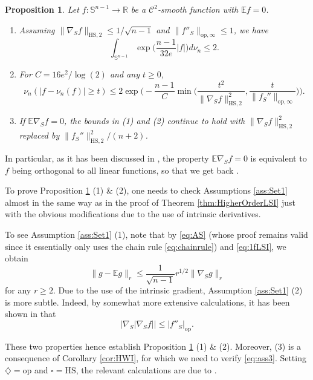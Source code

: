 \documentclass[a4paper,12pt]{amsart}
\numberwithin{equation}{section}
\newtheorem{proposition}[satz]{Proposition}
\theoremstyle{remark}
\def\E{{\mathbb E}}
\def\S{{\mathbb S}}
\begin{document}
\begin{proposition}\label{prop:HigherOrderSphereIntr}
	Let $f \colon \S^{n-1} \to \mathbb{R}$ be a $\mathcal{C}^2$-smooth function with $\E f =0$.
	\begin{enumerate}
		\item Assuming $\lVert \nabla_S f \rVert_{\mathrm{HS},2} \le 1/\sqrt{n-1}$ and $\lVert f''_S \rVert_{\mathrm{op},\infty} \le 1$, we have
		\[
		\int_{\S^{n-1}} \exp\Big(\frac{n-1}{32e} |f|\Big) d\nu_n \le 2.
		\]
		\item For $C = 16e^2/\log(2)$ and any $t \ge 0$,
		\[
		\nu_n(|f-\nu_n(f)| \ge t) \le 2 \exp\Big(-\frac{n-1}{C}\min\Big(\frac{t^2}{\lVert \nabla_S f \rVert_{\mathrm{HS},2}^2}, \frac{t}{\lVert f_S'' \rVert_{\mathrm{op},\infty}}\Big)\Big).
		\]
		\item If $\E \nabla_S f = 0$, the bounds in (1) and (2) continue to hold with $\lVert \nabla_S f \rVert_{\mathrm{HS},2}^2$ replaced by $\lVert f_S'' \rVert_{\mathrm{HS},2}^2/(n+2)$.
	\end{enumerate}
\end{proposition}

In particular, as it has been discussed in \cite{BCG17}, the property $\E \nabla_S f = 0$ is equivalent to $f$ being orthogonal to all linear functions, so that we get back \cite[Th.\ 1.1]{BCG17}.

To prove Proposition \ref{prop:HigherOrderSphereIntr} (1) \& (2), one needs to check Assumptions \ref{ass:Set1} almost in the same way as in the proof of Theorem \ref{thm:HigherOrderLSI} just with the obvious modifications due to the use of intrinsic derivatives.

To see Assumption \ref{ass:Set1} (1), note that by \eqref{eq:AS} (whose proof remains valid since it essentially only uses the chain rule \eqref{eq:chainrule}) and \eqref{eq:1fLSI}, we obtain
\begin{equation*} %
\lVert g - \E g \rVert_r \le \frac{1}{\sqrt{n-1}} r^{1/2} \lVert \nabla_S g \rVert_r
\end{equation*}
for any $r \ge 2$. Due to the use of the intrinsic gradient, Assumption \ref{ass:Set1} (2) is more subtle. Indeed, by somewhat more extensive calculations, it has been shown in \cite[Le.\ 3.1]{BCG17} that
\begin{equation}\label{eq:BCGitgrad}
	\lvert\nabla_S\lvert\nabla_S f \rvert \rvert \le \lvert f''_S \rvert_\mathrm{op}.
\end{equation}

These two properties hence establish Proposition \ref{prop:HigherOrderSphereIntr} (1) \& (2). Moreover, (3) is a consequence of Corollary \ref{cor:HWI}, for which we need to verify \eqref{eq:ass3}. Setting $\diamondsuit = \mathrm{op}$ and $\square = \mathrm{HS}$, the relevant calculations are due to \cite[Prop.\ 5.1]{BCG17}.
\end{document}
